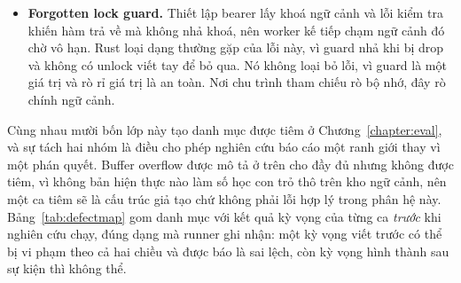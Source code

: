 \begin{itemize}
        đạt theo cách ranh giới hàm ngoại bắt buộc. Rust an toàn từ chối giải phóng kép vì sở
        hữu theo dõi giá trị. Một đường nối không giữ được điều đó, vì đưa con trỏ thô cho caller
        C chính là thao tác chấm dứt kiến thức của trình biên dịch về nó. Lớp do đó xuất hiện
        hai phía ranh giới, là phát biểu sắc nhất về bản chất ranh giới.
  \item \textbf{Forgotten lock guard.} Thiết lập bearer lấy khoá ngữ cảnh và lỗi kiểm tra khiến
        hàm trả về mà không nhả khoá, nên worker kế tiếp chạm ngữ cảnh đó chờ vô hạn. Rust loại
        dạng thường gặp của lỗi này, vì guard nhả khi bị drop và không có unlock viết tay để bỏ
        qua. Nó không loại bỏ lỗi, vì guard là một giá trị và rò rỉ giá trị là an toàn. Nơi chu
        trình tham chiếu rò bộ nhớ, đây rò chính ngữ cảnh.
\end{itemize}

Cùng nhau mười bốn lớp này tạo danh mục được tiêm ở Chương~\ref{chapter:eval}, và sự tách hai
nhóm là điều cho phép nghiên cứu báo cáo một ranh giới thay vì một phán quyết. Buffer overflow
được mô tả ở trên cho đầy đủ nhưng không được tiêm, vì không bản hiện thực nào làm số học con trỏ
thô trên kho ngữ cảnh, nên một ca tiêm sẽ là cấu trúc giả tạo chứ không phải lỗi hợp lý trong
phân hệ này. Bảng~\ref{tab:defectmap} gom danh mục với kết quả kỳ vọng của từng ca \emph{trước}
khi nghiên cứu chạy, đúng dạng mà runner ghi nhận: một kỳ vọng viết trước có thể bị vi phạm theo
cả hai chiều và được báo là sai lệch, còn kỳ vọng hình thành sau sự kiện thì không thể.

